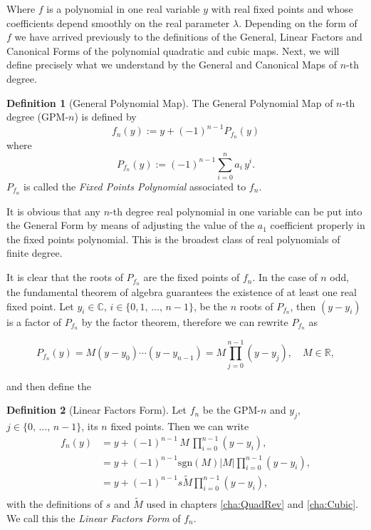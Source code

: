 \documentclass[10pt,twoside,titlepage]{book}
\numberwithin{equation}{chapter}
\numberwithin{figure}{chapter}
\numberwithin{table}{chapter}
\theoremstyle{plain}%
\theoremstyle{definition}
\newtheorem{defn}{Definition}[chapter]
\theoremstyle{remark}
\begin{document}
Where $f$ is a polynomial in one real variable $y$ with real fixed points and whose coefficients depend smoothly on the real parameter $\lambda$. Depending on the form of $f$ we have arrived previously to the definitions of the General, Linear Factors and Canonical Forms of the polynomial quadratic and cubic maps. Next, we will define precisely what we understand by the General and Canonical Maps of $n$-th degree.

\begin{defn}[General Polynomial Map]
	The General Polynomial Map of $n$-th degree (GPM-$n$) is defined by
	\begin{equation}
		f_n(y):= y+ (-1)^{n-1} P_{f_n}(y)
	\end{equation}
	where
	\begin{equation}
		P_{f_n}(y):=(-1)^{n-1}\sum_{i=0}^{n} a_i\,y^i.
	\end{equation}
	$P_{f_n}$ is called the \emph{Fixed Points Polynomial} associated to $f_n$.
\end{defn}

It is obvious that any $n$-th degree real polynomial in one variable can be put into the General Form by means of adjusting the value of the $a_1$ coefficient properly in the fixed points polynomial. This is the broadest class of real polynomials of finite degree.

It is clear that the roots of $P_{f_n}$ are the fixed points of $f_n$. In the case of $n$ odd, the fundamental theorem of algebra guarantees the existence of at least one real fixed point. Let $y_i\in\mathbb{C},\,i\in\{0,1,\,...,\,n-1\}$, be the $n$ roots of $P_{f_n}$, then $(y-y_i)$ is a factor of $P_{f_n}$ by the factor theorem, therefore we can rewrite $P_{f_n}$ as

\begin{equation}
	\label{eq:CPM-FPP}
	P_{f_n}(y)=M (y-y_0)\cdots (y-y_{n-1})=M\prod_{j=0}^{n-1}(y-y_j),\quad M\in\mathbb{R},
\end{equation}

and then define the

\begin{defn}[Linear Factors Form]
	\label{def:LinearFactorsForm}
	Let $f_n$ be the GPM-$n$ and $y_j$, $j\in\{0,\,...,\,n-1\}$, its $n$ fixed points. Then we can write
	\begin{equation}
		\begin{aligned}
			f_n(y)	&=y+(-1)^{n-1}\,M\,\prod_{i=0}^{n-1} (y-y_i),\\
			&=y+(-1)^{n-1}\mathrm{sgn}(M)|M|\prod_{i=0}^{n-1} (y-y_i),\\
			&=y+(-1)^{n-1}s\tilde{M}\prod_{i=0}^{n-1} (y-y_i),\\
		\end{aligned}
	\end{equation}
	with the definitions of $s$ and $\tilde{M}$ used in chapters \ref{cha:QuadRev} and \ref{cha:Cubic}. We call this the \emph{Linear Factors Form} of $f_n$.
\end{defn}
\end{document}
